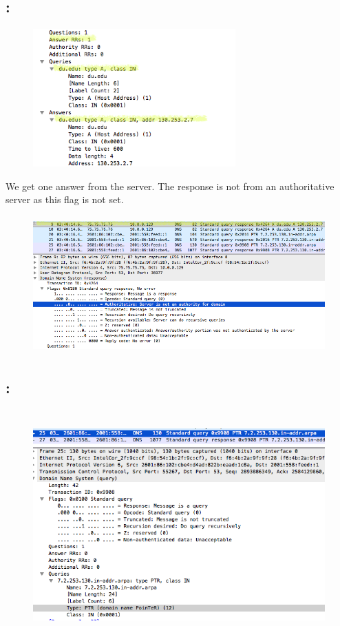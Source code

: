 \documentclass[]{report}
\begin{document}
\subsection{:}

\begin{figure}[H]
	\vspace{0pt}
	\includegraphics[height = 150pt, keepaspectratio]{Snapshots/q1/1_6_1.png}
\end{figure}

We get one answer from the server. The response is not from an authoritative server as this flag is not set. 

\begin{figure}[H]
	\vspace{0pt}
	\includegraphics[height = 150pt, keepaspectratio]{Snapshots/q1/1_6_2.png}
\end{figure}

\subsection{:}

\begin{figure}[H]
	\vspace{0pt}
	\includegraphics[height = 250pt, keepaspectratio]{Snapshots/q1/1_7.png}
\end{figure}
\end{document}

